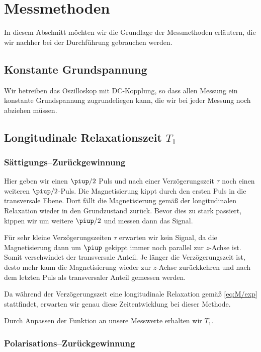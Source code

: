 \section{Messmethoden}

In diesem Abschnitt möchten wir die Grundlage der Messmethoden erläutern, die
wir nachher bei der Durchführung gebrauchen werden.

\subsection{Konstante Grundspannung}

Wir betreiben das Oszilloskop mit DC-Kopplung, so dass allen Messung ein
konstante Grundspannung zugrundeliegen kann, die wir bei jeder Messung noch
abziehen müssen.

\subsection{Longitudinale Relaxationszeit $T_1$}

\subsubsection{Sättigungs–Zurückgewinnung}

Hier geben wir einen $\piup/2$ Puls und nach einer Verzögerungszeit $\tau$ noch
einen weiteren $\piup/2$-Puls. Die Magnetisierung kippt durch den ersten Puls in
die transversale Ebene. Dort fällt die Magnetisierung gemäß der longitudinalen
Relaxation wieder in den Grundzustand zurück. Bevor dies zu stark passiert,
kippen wir um weitere $\piup/2$ und messen dann das Signal.

Für sehr kleine Verzögerungszeiten $\tau$ erwarten wir kein Signal, da die
Magnetisierung dann um $\piup$ gekippt immer noch parallel zur $z$-Achse ist.
Somit verschwindet der transversale Anteil. Je länger die Verzögerungszeit ist,
desto mehr kann die Magnetisierung wieder zur $z$-Achse zurückkehren und nach
dem letzten Puls als transversaler Anteil gemessen werden.

Da während der Verzögerungszeit eine longitudinale Relaxation gemäß
\eqref{eq:M/exp} stattfindet, erwarten wir genau diese Zeitentwicklung bei
dieser Methode.

Durch Anpassen der Funktion an unsere Messwerte erhalten wir $T_1$.

\subsubsection{Polarisations–Zurückgewinnung}

